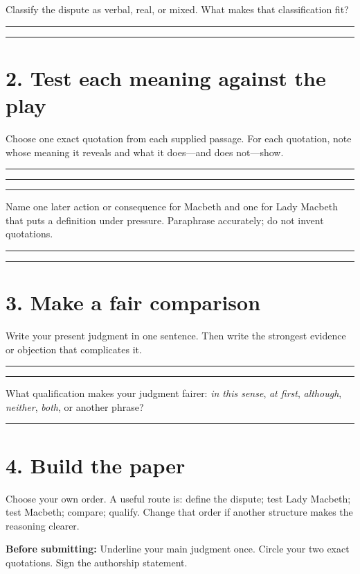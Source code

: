 \documentclass[11pt]{article}
\newcommand{\blankline}{\par\vspace{0.1em}\noindent\rule{\linewidth}{0.4pt}\par\vspace{0.34em}}
\begin{document}
Classify the dispute as verbal, real, or mixed. What makes that classification fit?
\blankline
\blankline

\section*{2. Test each meaning against the play}
Choose one exact quotation from each supplied passage. For each quotation, note whose meaning it reveals and what it does---and does not---show.
\blankline
\blankline
\blankline

Name one later action or consequence for Macbeth and one for Lady Macbeth that puts a definition under pressure. Paraphrase accurately; do not invent quotations.
\blankline
\blankline

\section*{3. Make a fair comparison}
Write your present judgment in one sentence. Then write the strongest evidence or objection that complicates it.
\blankline
\blankline

What qualification makes your judgment fairer: \emph{in this sense}, \emph{at first}, \emph{although}, \emph{neither}, \emph{both}, or another phrase?
\blankline

\section*{4. Build the paper}
Choose your own order. A useful route is: define the dispute; test Lady Macbeth; test Macbeth; compare; qualify. Change that order if another structure makes the reasoning clearer.

\vfill
\textbf{Before submitting:} Underline your main judgment once. Circle your two exact quotations. Sign the authorship statement.
\end{document}
